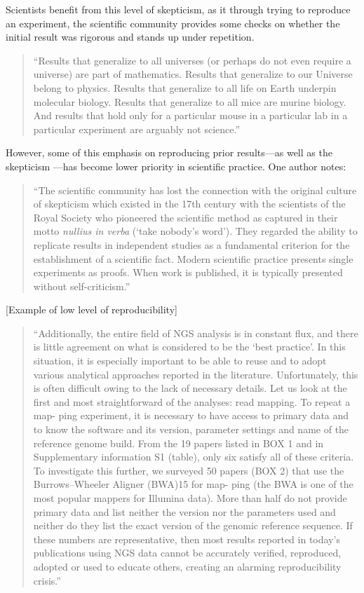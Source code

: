 \documentclass[]{tufte-book}
\begin{document}
Scientists benefit from this level of skepticism, as it through trying to
reproduce an experiment, the scientific community provides some checks on
whether the initial result was rigorous and stands up under repetition.

\begin{quote}
``Results that generalize to all universes (or perhaps do not even require a
universe) are part of mathematics. Results that generalize to our Universe belong
to physics. Results that generalize to all life on Earth underpin molecular
biology. Results that generalize to all mice are murine biology. And results that
hold only for a particular mouse in a particular lab in a particular experiment
are arguably not science.'' \citep{stark2018before}
\end{quote}

However, some of this emphasis on reproducing prior results---as well as the
skepticism ---has become lower priority in scientific practice. One author notes:

\begin{quote}
``The scientific community has lost the connection with the original culture of
skepticism which existed in the 17th century with the scientists of the
Royal Society who pioneered the scientific method as captured in their motto
\emph{nullius in verba} (`take nobody's word'). They regarded the ability to replicate
results in independent studies as a fundamental criterion for the establishment
of a scientific fact. Modern scientific practice presents single experiments
as proofs. When work is published, it is typically presented without self-criticism.'' \citep{neff2021past}
\end{quote}

{[}Example of low level of reproducibility{]}

\begin{quote}
``Additionally, the entire field of NGS analysis is in constant flux, and there
is little agreement on what is considered to be the `best practice'. In this
situation, it is especially important to be able to reuse and to adopt various
analytical approaches reported in the literature. Unfortunately, this is often
difficult owing to the lack of necessary details. Let us look at the first and
most straightforward of the analyses: read mapping. To repeat a map- ping
experiment, it is necessary to have access to primary data and to know the
software and its version, parameter settings and name of the reference genome
build. From the 19 papers listed in BOX 1 and in Supplementary information S1
(table), only six satisfy all of these criteria. To investigate this further, we
surveyed 50 papers (BOX 2) that use the Burrows--Wheeler Aligner (BWA)15 for map-
ping (the BWA is one of the most popular mappers for Illumina data). More than
half do not provide primary data and list neither the version nor the parameters
used and neither do they list the exact version of the genomic reference
sequence. If these numbers are representative, then most results reported in
today's publications using NGS data cannot be accurately verified, reproduced,
adopted or used to educate others, creating an alarming reproducibility crisis.''
\citep{nekrutenko2012next}
\end{quote}
\end{document}
